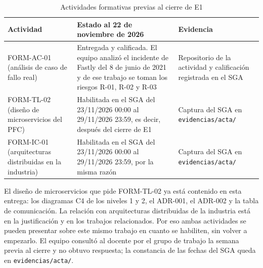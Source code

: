 \begin{table}[H]
\centering
\caption{Actividades formativas previas al cierre de E1}
\label{tab:formativas}
\small
\begin{tabularx}{\linewidth}{@{}lYY@{}}
\toprule
Actividad & Estado al 22 de noviembre de 2026 & Evidencia \\
\midrule
FORM-AC-01 (análisis de caso de fallo real) & Entregada y calificada. El equipo analizó el incidente
de Fastly del 8 de junio de 2021 y de ese trabajo se toman los riesgos R-01, R-02 y R-03 & Repositorio
de la actividad y calificación registrada en el SGA \\
\addlinespace
FORM-TL-02 (diseño de microservicios del PFC) & Habilitada en el SGA del 23/11/2026 00:00 al
29/11/2026 23:59, es decir, después del cierre de E1 & Captura del SGA en \texttt{evidencias/acta/} \\
\addlinespace
FORM-IC-01 (arquitecturas distribuidas en la industria) & Habilitada en el SGA del 23/11/2026 00:00
al 29/11/2026 23:59, por la misma razón & Captura del SGA en \texttt{evidencias/acta/} \\
\bottomrule
\end{tabularx}
\end{table}

El diseño de microservicios que pide FORM-TL-02 ya está contenido en esta entrega: los diagramas C4 de
los niveles 1 y 2, el ADR-001, el ADR-002 y la tabla de comunicación. La relación con arquitecturas
distribuidas de la industria está en la justificación y en los trabajos relacionados. Por eso ambas
actividades se pueden presentar sobre este mismo trabajo en cuanto se habiliten, sin volver a
empezarlo. El equipo consultó al docente por el grupo de trabajo la semana previa al cierre y no
obtuvo respuesta; la constancia de las fechas del SGA queda en \texttt{evidencias/acta/}.
